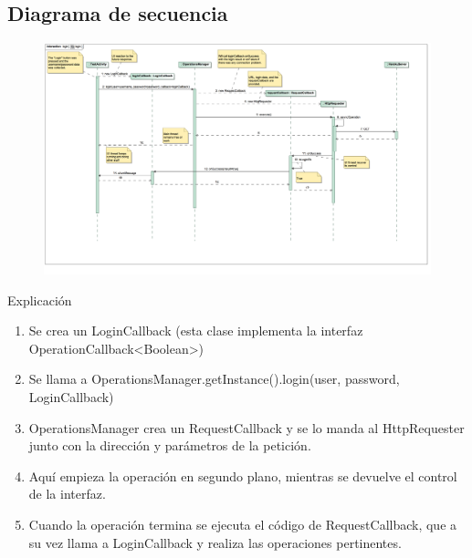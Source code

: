\documentclass{beamer}
\begin{document}
\subsection{Diagrama de secuencia}
\begin{frame}
\begin{figure}
\begin{center}
\includegraphics[scale=0.30]{../observer-pattern/diagrams/login}
\end{center}
\end{figure}
\end{frame}

\begin{frame}{Explicación}
\begin{enumerate}
\item Se crea un LoginCallback (esta clase implementa la interfaz OperationCallback<Boolean>)
\item Se llama a OperationsManager.getInstance().login(user, password, LoginCallback)
\item OperationsManager crea un RequestCallback y se lo manda al HttpRequester junto con la dirección y parámetros de la petición.
\item Aquí empieza la operación en segundo plano, mientras se devuelve el control de la interfaz.
\item Cuando la operación termina se ejecuta el código de RequestCallback, que a su vez llama a LoginCallback y realiza las operaciones pertinentes.
\end{enumerate} 
\end{frame}
\end{document}
